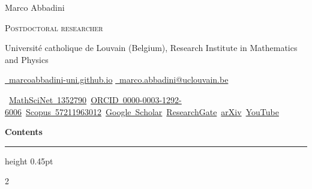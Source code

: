 \documentclass[10pt,letterpaper]{article}
\makeatletter
\newcommand{\profilesep}{\hspace{.42em}\textcolor{rulecolor}{\textperiodcentered}\hspace{.42em}}
\newcounter{publication}
\newcounter{talk}
\newcommand{\sectionline}[1]{%
  {\fontsize{17pt}{20pt}\selectfont\bfseries\color{accent}#1\enspace
   \textcolor{rulecolor}{\leaders\hrule height 0.45pt\hfill}\kern0pt\par}}
\newcommand{\cvcontents}{%
  \vspace{4pt}\sectionline{Contents}\vspace{5pt}
  \begingroup
    \fontsize{10.3pt}{14pt}\selectfont
    \setlength{\multicolsep}{0pt}%
    \setlength{\columnsep}{.07\linewidth}%
    \begin{multicols}{2}\@starttoc{toc}\end{multicols}%
  \endgroup}
\makeatother
\begin{document}
\color{ink}
\begin{center}
{\namefont\fontsize{30pt}{33pt}\selectfont Marco Abbadini\par}
\vspace{1pt}
{\fontsize{11.3pt}{15pt}\selectfont{}\scshape\color{accent}Postdoctoral researcher\par}
\vspace{1.5pt}
{\fontsize{10.5pt}{13.5pt}\selectfont\color{secondary}Université catholique de Louvain (Belgium), Research Institute in Mathematics and Physics\par}
\vspace{4pt}
{\fontsize{9.6pt}{12pt}\selectfont
\href{https://marcoabbadini-uni.github.io}{\faHome\, marcoabbadini-uni.github.io}\quad
\textcolor{rulecolor}{\textbar}\quad
\href{mailto:marco.abbadini@uclouvain.be}{\faEnvelope[regular]\, marco.abbadini@uclouvain.be}\par}
\vspace{2pt}
{\fontsize{9.2pt}{12pt}\selectfont\mbox{%
\href{https://mathscinet.ams.org/mathscinet/MRAuthorID/1352790}{MathSciNet 1352790}\profilesep
\href{https://orcid.org/0000-0003-1292-6006}{ORCID 0000-0003-1292-6006}\profilesep
\href{https://www.scopus.com/authid/detail.uri?authorId=57211963012}{Scopus 57211963012}\profilesep
\href{https://scholar.google.com/citations?user=dTfqNjoAAAAJ}{Google Scholar}\profilesep
\href{https://www.researchgate.net/profile/Marco-Abbadini}{ResearchGate}\profilesep
\href{https://arxiv.org/search/math?searchtype=author&query=Abbadini,+Marco}{arXiv}\profilesep
\href{https://www.youtube.com/channel/UCn2PoVWwdOymxJF2j-C51lg/videos}{YouTube}}\par}
\end{center}
\cvcontents













\end{document}
